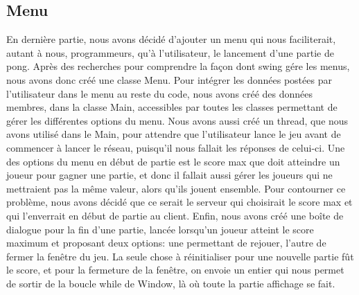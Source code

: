 \subsection{Menu}
En dernière partie, nous avons décidé d'ajouter un menu qui nous faciliterait, autant à nous, programmeurs, qu'à 
l'utilisateur, 
le lancement d'une partie de pong. Après des recherches pour comprendre la façon dont swing gére les menus, nous 
avons donc créé
une 
classe Menu.
Pour intégrer les données postées par l'utilisateur dans le menu au reste du code, nous 
avons créé des données membres, dans la classe Main, 
accessibles par
toutes les classes permettant de gérer les différentes options du menu. 
Nous avons aussi créé un thread, que nous avons utilisé 
dans le Main, pour attendre que l'utilisateur lance le jeu avant de commencer à lancer le réseau, puisqu'il nous 
fallait les réponses de celui-ci.
Une des options du menu en début de partie est le score max que doit atteindre un joueur pour gagner une partie, et donc il 
fallait aussi gérer les joueurs qui ne mettraient pas la même valeur, alors qu'ils jouent ensemble. Pour contourner 
ce problème, 
nous avons décidé que ce serait le serveur qui choisirait le score max et qui l'enverrait en début de partie au client.
Enfin, nous avons créé une boîte de dialogue pour la fin d'une partie, lancée lorsqu'un joueur atteint le score maximum et 
proposant deux options: une permettant de rejouer, l'autre de fermer la fenêtre du jeu. La seule chose 
à réinitialiser pour une nouvelle partie
fût le score, et pour la fermeture de la fenêtre, on envoie un entier qui nous permet de sortir 
de la boucle while de Window, 
là où toute la partie affichage se fait.